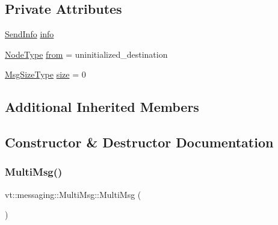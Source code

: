 \subsection*{Private Attributes}
\begin{DoxyCompactItemize}
\item 
\hyperlink{structvt_1_1messaging_1_1_send_info}{Send\+Info} \hyperlink{structvt_1_1messaging_1_1_multi_msg_ad47d1f9a6bb2661d88e11e80b462aaf0}{info}
\item 
\hyperlink{namespacevt_a866da9d0efc19c0a1ce79e9e492f47e2}{Node\+Type} \hyperlink{structvt_1_1messaging_1_1_multi_msg_a5686b316a79761a7e75b5206506be048}{from} = uninitialized\+\_\+destination
\item 
\hyperlink{namespacevt_a408e86a8c7c89309b52907dc5a513924}{Msg\+Size\+Type} \hyperlink{structvt_1_1messaging_1_1_multi_msg_a05e791d373d9a5c0eb54c55a32af7cb9}{size} = 0
\end{DoxyCompactItemize}
\subsection*{Additional Inherited Members}


\subsection{Constructor \& Destructor Documentation}
\mbox{\label{structvt_1_1messaging_1_1_multi_msg_a1f4aa450c0ff93dd39b6d92ebf608ada}} 
\subsubsection{\texorpdfstring{Multi\+Msg()}{MultiMsg()}\hspace{0.1cm}{\footnotesize\ttfamily [1/2]}}
{\footnotesize\ttfamily vt\+::messaging\+::\+Multi\+Msg\+::\+Multi\+Msg (\begin{DoxyParamCaption}{ }\end{DoxyParamCaption})\hspace{0.3cm}{\ttfamily [default]}}

\mbox{\label{structvt_1_1messaging_1_1_multi_msg_acd927cddf86133a0cf418ac8e44ccea0}} 
